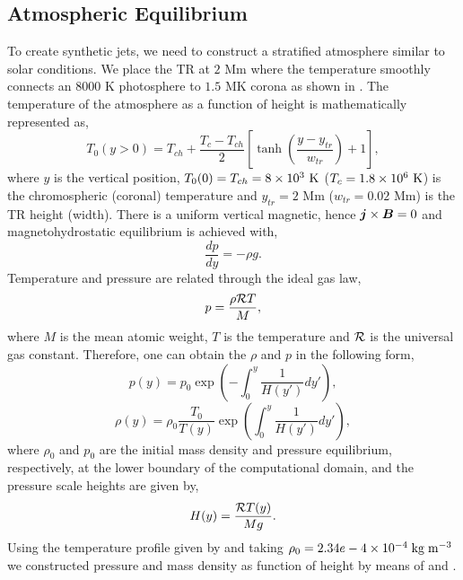 \subsection{Atmospheric Equilibrium}
\label{sec:atmos_equil}
To create synthetic jets, we need to construct a stratified atmosphere similar to solar conditions. We place the TR at $2$ Mm where the temperature smoothly connects an $8000$ K photosphere to $1.5$ MK corona as shown in . The temperature of the atmosphere as a function of height is mathematically represented as,   
\begin{equation}\label{te_pro}
T_0(y>0) = T_{ch}+\frac{T_{c} - T_{ch}}{2} \left[ \tanh \left( \frac{y-y_{tr}}{w_{tr}} \right)+1 \right],
\end{equation}
where $y$ is the vertical position, $T_0(0)=T_{ch}=8\times10^3 \ \rm{K}$ ($T_{c}=1.8\times10^6 \ \rm{K}$) is the chromospheric (coronal) temperature and $y_{tr}=2$ Mm ($w_{tr}=0.02$ Mm) is the TR height (width). There is a uniform vertical magnetic, hence $\boldsymbol{j} \times \boldsymbol{B}=0$ and magnetohydrostatic equilibrium is achieved with,
\begin{equation}
\frac{dp}{dy} = - \rho g.
\end{equation}
Temperature and pressure are related through the ideal gas law,
\begin{equation}
p = \frac{ \rho \mathcal{R} T}{M},
\end{equation} 
where $M$ is the mean atomic weight, $T$ is the temperature and $\mathcal{R}$ is the universal gas constant. Therefore, one can obtain the $\rho$ and $p$ in the following form,  
\begin{equation}\label{p_pro}
p(y) = p_0 \exp \left( - \int_0^y  \frac{1}{H(y')} dy' \right), 
\end{equation} 
\begin{equation}\label{rho_pro}
\rho(y) = \rho_0 \frac{T_0}{T(y)} \exp \left( \int_0^y \frac{1}{H(y') }dy' \right),
\end{equation}
where $\rho_0$ and $p_0$ are the initial mass density and pressure equilibrium, respectively, at the lower boundary of the computational domain, and the pressure scale heights are given by,
\begin{equation}
H(y) = \frac{\mathcal{R} T(y)}{Mg}.
\end{equation}
Using the temperature profile given by  and taking $\rho_0 = 2.34e-4\times10^{-4}\;\rm{kg}\;\rm{m^{-3}}$ we constructed pressure and mass density as function of height by means of  and .
